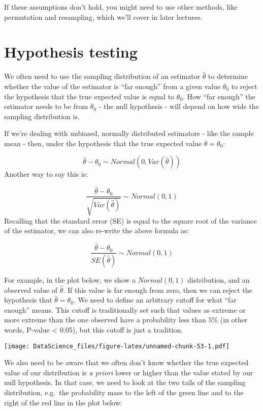 \documentclass[
]{book}
\begin{document}
If these assumptions don't hold, you might need to use other methods, like permutation and resampling, which we'll cover in later lectures.

\hypertarget{hypothesis-testing}{%
\section{Hypothesis testing}\label{hypothesis-testing}}

We often need to use the sampling distribution of an estimator \(\hat{\theta}\) to determine whether the value of the estimator is ``far enough'' from a given value \(\theta_0\) to reject the hypothesis that the true expected value is equal to \(\theta_0\). How ``far enough'' the estimator needs to be from \(\theta_0\) - the null hypothesis - will depend on how wide the sampling distribution is.

If we're dealing with unbiased, normally distributed estimators - like the sample mean - then, under the hypothesis that the true expected value \(\theta = \theta_0\):

\[\hat{\theta} - \theta_0 \sim Normal(0, Var(\hat{\theta}))\]
Another way to say this is:

\[\frac{\hat{\theta} - \theta_0}{\sqrt{Var(\hat{\theta})}} \sim Normal(0, 1)\]
Recalling that the standard error (SE) is equal to the square root of the variance of the estimator, we can also re-write the above formula as:

\[\frac{\hat{\theta} - \theta_0}{SE(\hat{\theta})} \sim Normal(0, 1)\]

For example, in the plot below, we show a \(Normal(0,1)\) distribution, and an observed value of \(\hat{\theta}\). If this value is far enough from zero, then we can reject the hypothesis that \(\hat{\theta} = \theta_0\). We need to define an arbitrary cutoff for what ``far enough'' means. This cutoff is traditionally set such that values as extreme or more extreme than the one observed have a probability less than \(5\%\) (in other words, P-value \textless{} 0.05), but this cutoff is just a tradition.

\texttt{[image: DataScience\_files/figure-latex/unnamed-chunk-53-1.pdf]}

We also need to be aware that we often don't know whether the true expected value of our distribution is \emph{a priori} lower or higher than the value stated by our null hypothesis. In that case, we need to look at the two tails of the sampling distribution, e.g.~the probability mass to the left of the green line and to the right of the red line in the plot below:
\end{document}

